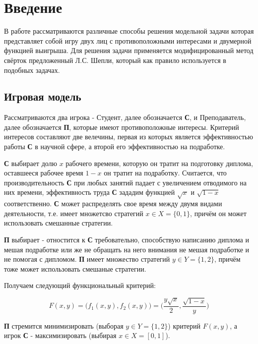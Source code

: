 \section{Введение}
\begin{flushleft}

\qquad В работе рассматриваются различные способы решения модельной задачи которая
представляет собой игру двух лиц с противоположными интересами и двумерной
функцией выигрыша. Для решения задачи применяется модифицированный
метод свёрток предложенный Л.С. Шепли, который как правило используется в
подобных задачах.

\subsection{Игровая модель}

\qquad Рассматриваются два игрока - Студент, далее обозначается \textbf{С},
и Преподаватель, далее обозначается \textbf{П}, которые имеют противоположные интересы.
Критерий интересов составляют две велечины, первая из которых является эффективностью
работы \textbf{С} в научной сфере, а второй его эффективностью на подработке.

\qquad \textbf{С} выбирает долю $x$ рабочего времени, которую он тратит на подготовку
диплома, оставшееся рабочее время $1-x$ он тратит на подработку. Считается, что производительность \textbf{С} при любых занятий падает с увеличением 
отводимого на них времени, эффективность труда \textbf{С} зададим функцией $\sqrt{x}$
и $\sqrt{1-x}$ соответственно. \textbf{С} может распределять свое время между двумя 
видами деятельности, т.е. имеет множетсво стратегий $x\in X = \{0, 1\}$, 
причём он может использовать смешанные стратегии.

\qquad \textbf{П} выбирает - отностится к \textbf{С} требовательно, способствую 
написанию диплома и мешая подработке или же не обращать на него внимания не 
мешая подработке и не помогая с дипломом. \textbf{П} имеет множество стратегий 
$y \in Y=\{1, 2\}$, причём тоже может использовать смешаные стратегии.

\vspace{5mm}
\qquad Получаем следующий функциональный критерий:

$$
F(x, y)=
\big(f_1(x,y), f_2(x,y)\big) =
\Big(
	\frac{y\sqrt{x}}2,
	\frac{\sqrt{1-x}}y
\Big)
$$

\qquad \textbf{П} стремится минимизировать (выборая $y \in Y = \{1,2\}$)
критерий $F(x, y)$, а игрок \textbf{С} - максимизировать
 (выбирая $x \in X=[0,1]$).


\end{flushleft}

